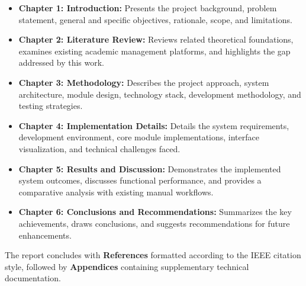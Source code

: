 \begin{itemize}
  \item \textbf{Chapter 1: Introduction:} Presents the project background, problem statement, general and specific objectives, rationale, scope, and limitations.
  
  \item \textbf{Chapter 2: Literature Review:} Reviews related theoretical foundations, examines existing academic management platforms, and highlights the gap addressed by this work.
  
  \item \textbf{Chapter 3: Methodology:} Describes the project approach, system architecture, module design, technology stack, development methodology, and testing strategies.
  
  \item \textbf{Chapter 4: Implementation Details:} Details the system requirements, development environment, core module implementations, interface visualization, and technical challenges faced.
  
  \item \textbf{Chapter 5: Results and Discussion:} Demonstrates the implemented system outcomes, discusses functional performance, and provides a comparative analysis with existing manual workflows.
  
  \item \textbf{Chapter 6: Conclusions and Recommendations:} Summarizes the key achievements, draws conclusions, and suggests recommendations for future enhancements.
\end{itemize}

The report concludes with \textbf{References} formatted according to the IEEE citation style, followed by \textbf{Appendices} containing supplementary technical documentation.
